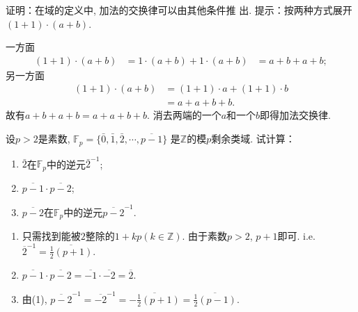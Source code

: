 \begin{problem}\label{ex:1.1.5}
    证明：在域的定义中, 加法的交换律可以由其他条件推
出. 提示：按两种方式展开 $(1 + 1) \cdot (a + b)$.
\end{problem}

\begin{solution}
    一方面
\[
\begin{aligned}
    (1 + 1) \cdot (a + b) &= 1 \cdot (a + b) + 1 \cdot (a + b)
    &= a + b + a + b;
\end{aligned}    
\]
    另一方面
\[
\begin{aligned}
    (1 + 1) \cdot (a + b) &= (1 + 1) \cdot a + (1 + 1) \cdot b\\
    &= a + a + b + b.
\end{aligned}
\]
故有$a + b + a + b = a + a + b + b$.
消去两端的一个$a$和一个$b$即得加法交换律.
\end{solution}

\begin{problem}
    设$p > 2$是素数,
$\mathbb{F}_p = \{\bar{0}, \bar{1}, \bar{2}, \cdots, \overline{p-1}\}$
是$\mathbb{Z}$的模$p$剩余类域. 试计算：
\begin{enumerate}[(1)]
    \item $\bar{2}$在$\mathbb{F}_p$中的逆元$\bar{2}^{-1}$;
    \item $\overline{p - 1} \cdot \overline{p - 2}$;
    \item $\overline{p - 2}$在$\mathbb{F}_p$中的逆元$\overline{p-2}^{-1}$.
\end{enumerate}
\end{problem}

\begin{solution}
\begin{enumerate}[(1)]
    \item 只需找到能被$2$整除的$1 + kp(k \in \mathbb{Z})$.
由于素数$p > 2$, $p + 1$即可. i.e. $\overline{2}^{-1} = \overline{\frac12(p + 1)}$.
    \item $\overline{p - 1} \cdot \overline{p - 2} = \overline{-1} \cdot \overline{-2} = \overline{2}$.
    \item 由(1), $\overline{p - 2}^{-1} = \overline{-2}^{-1} = \overline{-\frac12(p + 1)} = \overline{\frac12(p - 1)}$.
\end{enumerate}
\end{solution}
    